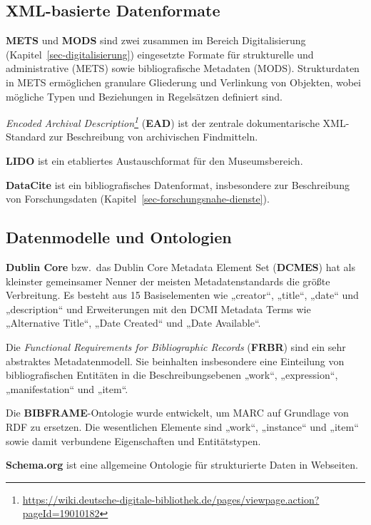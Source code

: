 \documentclass[
  11pt,
  letterpaper,
  DIV=11,
  twoside]{scrreprt}
\DeclareRobustCommand{\href}[2]{#2\footnote{\url{#1}}}
\begin{document}
\subsection{XML-basierte Datenformate}\label{xml-basierte-datenformate}

\textbf{METS} und \textbf{MODS} sind zwei zusammen im Bereich
Digitalisierung (Kapitel~\ref{sec-digitalisierung}) eingesetzte Formate
für strukturelle und administrative (METS) sowie bibliografische
Metadaten (MODS). Strukturdaten in METS ermöglichen granulare Gliederung
und Verlinkung von Objekten, wobei mögliche Typen und Beziehungen in
Regelsätzen definiert sind.

\emph{\href{https://wiki.deutsche-digitale-bibliothek.de/pages/viewpage.action?pageId=19010182}{Encoded
Archival Description}} (\textbf{EAD}) ist der zentrale dokumentarische
XML-Standard zur Beschreibung von archivischen Findmitteln.

\textbf{LIDO} ist ein etabliertes Austauschformat für den
Museumsbereich.

\textbf{DataCite} ist ein bibliografisches Datenformat, insbesondere zur
Beschreibung von Forschungsdaten
(Kapitel~\ref{sec-forschungsnahe-dienste}).

\subsection{Datenmodelle und
Ontologien}\label{datenmodelle-und-ontologien}

\textbf{Dublin Core} bzw.~das Dublin Core Metadata Element Set
(\textbf{DCMES}) hat als kleinster gemeinsamer Nenner der meisten
Metadatenstandards die größte Verbreitung. Es besteht aus 15
Basiselementen wie „creator``, „title``, „date`` und „description`` und
Erweiterungen mit den DCMI Metadata Terms wie „Alternative Title``,
„Date Created`` und „Date Available``.

Die \emph{Functional Requirements for Bibliographic Records}
(\textbf{FRBR}) sind ein sehr abstraktes Metadatenmodell. Sie beinhalten
insbesondere eine Einteilung von bibliografischen Entitäten in die
Beschreibungsebenen „work``, „expression``, „manifestation`` und
„item``.

Die \textbf{BIBFRAME}-Ontologie wurde entwickelt, um MARC auf Grundlage
von RDF zu ersetzen. Die wesentlichen Elemente sind „work``, „instance``
und „item`` sowie damit verbundene Eigenschaften und Entitätstypen.

\textbf{Schema.org} ist eine allgemeine Ontologie für strukturierte
Daten in Webseiten.
\end{document}
